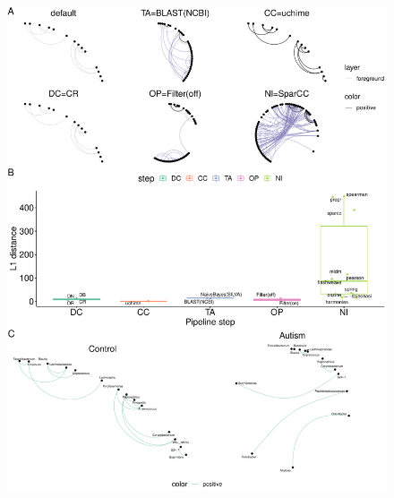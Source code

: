 \documentclass[letterpaper,12pt]{article}
\begin{document}
  \begin{figure}[H]
    \centering
    \includegraphics[width=1.0\linewidth]{figure7.pdf}
  \end{figure}
\end{document}
